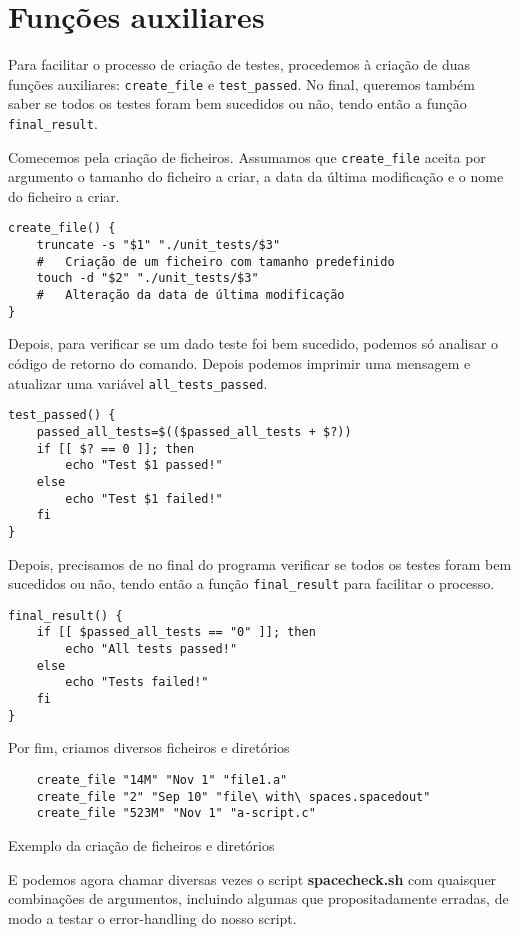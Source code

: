 \section{Funções auxiliares}

Para facilitar o processo de criação de testes, procedemos à criação de duas funções auxiliares: \verb|create_file| e
\verb|test_passed|. No final, queremos também saber se todos os testes foram bem sucedidos ou não, tendo então a função
\verb|final_result|.

Comecemos pela criação de ficheiros. Assumamos que \verb|create_file| aceita por argumento o tamanho do ficheiro a
criar, a data da última modificação e o nome do ficheiro a criar.
\begin{verbatim}
create_file() {
    truncate -s "$1" "./unit_tests/$3"
    #   Criação de um ficheiro com tamanho predefinido
    touch -d "$2" "./unit_tests/$3"
    #   Alteração da data de última modificação
}
\end{verbatim}

Depois, para verificar se um dado teste foi bem sucedido, podemos só analisar o código de retorno do comando. Depois
podemos imprimir uma mensagem e atualizar uma variável \verb|all_tests_passed|.

\begin{verbatim}
test_passed() {
    passed_all_tests=$(($passed_all_tests + $?))
    if [[ $? == 0 ]]; then
        echo "Test $1 passed!"
    else
        echo "Test $1 failed!"
    fi
}
\end{verbatim}

Depois, precisamos de no final do programa verificar se todos os testes foram bem sucedidos ou não, tendo então a função
\verb|final_result| para facilitar o processo.

\begin{verbatim}
final_result() {
    if [[ $passed_all_tests == "0" ]]; then
        echo "All tests passed!"
    else
        echo "Tests failed!"
    fi
}
\end{verbatim}

Por fim, criamos diversos ficheiros e diretórios
\begin{listing}[H]
\begin{verbatim}
    create_file "14M" "Nov 1" "file1.a"
    create_file "2" "Sep 10" "file\ with\ spaces.spacedout"
    create_file "523M" "Nov 1" "a-script.c"
\end{verbatim}
\caption{Exemplo da criação de ficheiros e diretórios}
\end{listing}
E podemos agora chamar diversas vezes o script \textbf{spacecheck.sh} com quaisquer combinações de argumentos, incluindo
algumas que propositadamente erradas, de modo a testar o error-handling do nosso script.

